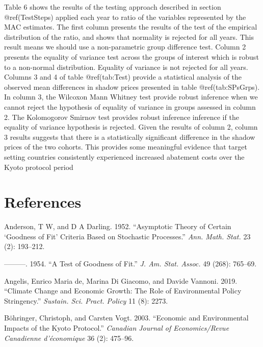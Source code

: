 \documentclass[
  10pt,
]{article}
\begin{document}
Table 6 shows the results of the testing approach described in section
@ref(TestSteps) applied each year to ratio of the variables represented
by the MAC estimates. The first column presents the results of the test
of the empirical distribution of the ratio, and shows that normality is
rejected for all years. This result means we should use a non-parametric
group difference test. Column 2 presents the equality of variance test
across the groups of interest which is robust to a non-normal
distribution. Equality of variance is not rejected for all years.
Columns 3 and 4 of table @ref(tab:Test) provide a statistical analysis
of the observed mean differences in shadow prices presented in table
@ref(tab:SPsGrps). In column 3, the Wilcoxon Mann Whitney test provide
robust inference when we cannot reject the hypothesis of equality of
variance in groups assessed in column 2. The Kolomogorov Smirnov test
provides robust inference inference if the equality of variance
hypothesis is rejected. Given the results of column 2, column 3 results
suggests that there is a statistically significant difference in the
shadow prices of the two cohorts. This provides some meaningful evidence
that target setting countries consistently experienced increased
abatement costs over the Kyoto protocol period

\hypertarget{references}{%
\section*{References}\label{references}}

\hypertarget{refs}{}
\leavevmode\hypertarget{ref-Anderson1952}{}%
Anderson, T W, and D A Darling. 1952. ``Asymptotic Theory of Certain
`Goodness of Fit' Criteria Based on Stochastic Processes.'' \emph{Ann.
Math. Stat.} 23 (2): 193--212.

\leavevmode\hypertarget{ref-Anderson1954}{}%
---------. 1954. ``A Test of Goodness of Fit.'' \emph{J. Am. Stat.
Assoc.} 49 (268): 765--69.

\leavevmode\hypertarget{ref-De_Angelis2019}{}%
Angelis, Enrico Maria de, Marina Di Giacomo, and Davide Vannoni. 2019.
``Climate Change and Economic Growth: The Role of Environmental Policy
Stringency.'' \emph{Sustain. Sci. Pract. Policy} 11 (8): 2273.

\leavevmode\hypertarget{ref-Bohringer2003}{}%
Böhringer, Christoph, and Carsten Vogt. 2003. ``Economic and
Environmental Impacts of the Kyoto Protocol.'' \emph{Canadian Journal of
Economics/Revue Canadienne d'économique} 36 (2): 475--96.
\end{document}
